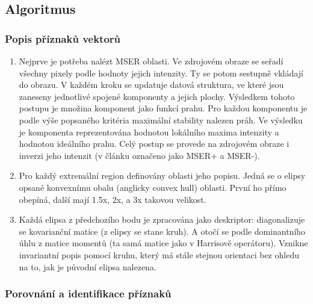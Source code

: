 	\subsection{Algoritmus}
	
	\subsubsection{Popis příznaků vektorů}
		
	\begin{enumerate}
		\item Nejprve je potřeba nalézt MSER oblasti. Ve zdrojovém obraze se seřadí všechny pixely podle hodnoty jejich intenzity. Ty se potom sestupně vkládají do obrazu. V každém kroku se updatuje datová struktura, ve které jsou zaneseny jednotlivé spojené komponenty a jejich plochy. Výsledkem tohoto postupu je množina komponent jako funkcí prahu. Pro každou komponentu je podle výše popsaného kritéria maximální stability nalezen práh. Ve výsledku je komponenta reprezentována hodnotou lokálního maxima intenzity a hodnotou ideálního prahu. Celý postup se provede na zdrojovém obraze i inverzi jeho intenzit (v článku označeno jako MSER+ a MSER-).
		
		\item Pro každý extremální	region definovány oblasti jeho popisu. Jedná se o elipsy opsané konvexnímu obalu (anglicky convex hull) oblasti. První ho přímo obepíná, další mají 1.5x, 2x, a 3x takovou velikost.
		
		\item Každá elipsa z předchozího bodu je zpracována jako deskriptor: diagonalizuje se kovarianční matice (z elipsy se stane kruh). A otočí se podle dominantního úhlu z matice momentů (ta samá matice jako v Harrisově operátoru). Vznikne invariantní popis pomocí kruhu, který má stále stejnou orientaci bez ohledu na to, jak je původní elipsa nalezena.	
	\end{enumerate}
	
	\subsubsection{Porovnání a identifikace příznaků}
	
